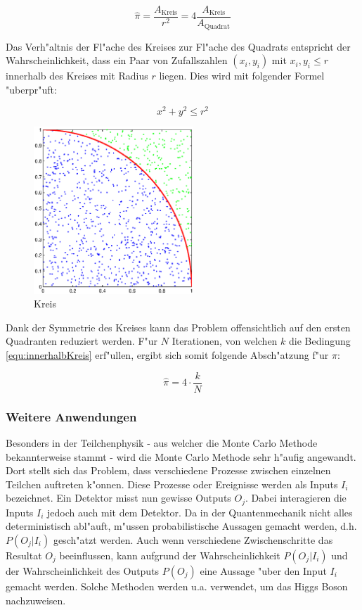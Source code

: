 \begin{refsection}
\begin{equation}
	\hat{\pi} = \frac{A_{\text{Kreis}}}{r^2} = 4 \frac{A_{\text{Kreis}}}{A_{\text{Quadrat}}}
\end{equation}

Das Verh"altnis der Fl"ache des Kreises zur Fl"ache des Quadrats
entspricht der Wahrscheinlichkeit, dass ein Paar von Zufallszahlen
$(x_i,y_i)$ mit $x_i,y_i \leq r$ innerhalb des Kreises mit Radius $r$
liegen. Dies wird mit folgender Formel "uberpr"uft:

\begin{equation}
x^2 + y^2 \leq r^2
\label{equ:innerhalbKreis}
\end{equation}

\begin{figure}[htbp]
	\centering
	\includegraphics[width=6cm]{montecarlo/images/kreis_hitmiss.eps}
	\caption{Kreis}
	\label{fig:KreisHitMiss}
\end{figure}

Dank der Symmetrie des Kreises kann das Problem offensichtlich auf den
ersten Quadranten reduziert werden. F"ur $N$ Iterationen, von welchen
$k$ die Bedingung \ref{equ:innerhalbKreis} erf"ullen, ergibt sich somit
folgende Absch"atzung f"ur $\pi$:

\begin{equation}
	\hat{\pi} = 4 \cdot \frac{k}{N}
\end{equation}


\subsubsection{Weitere Anwendungen}
Besonders in der Teilchenphysik - aus welcher die Monte Carlo Methode
bekannterweise stammt - wird die Monte Carlo Methode sehr h"aufig
angewandt. Dort stellt sich das Problem, dass verschiedene Prozesse
zwischen einzelnen Teilchen auftreten k"onnen. Diese Prozesse oder
Ereignisse werden als Inputs $I_i$ bezeichnet. Ein Detektor misst nun
gewisse Outputs $O_j$. Dabei interagieren die Inputs $I_i$ jedoch auch
mit dem Detektor. Da in der Quantenmechanik nicht alles deterministisch
abl"auft, m"ussen probabilistische Aussagen gemacht werden, d.h. $P(O_j
| I_i)$ gesch"atzt werden. Auch wenn verschiedene Zwischenschritte das
Resultat $O_j$ beeinflussen, kann aufgrund der Wahrscheinlichkeit $P(O_j |
I_i)$ und der Wahrscheinlichkeit des Outputs $P(O_j)$ eine Aussage "uber
den Input $I_i$ gemacht werden. Solche Methoden werden u.a. verwendet,
um das Higgs Boson nachzuweisen. 


\end{refsection}
